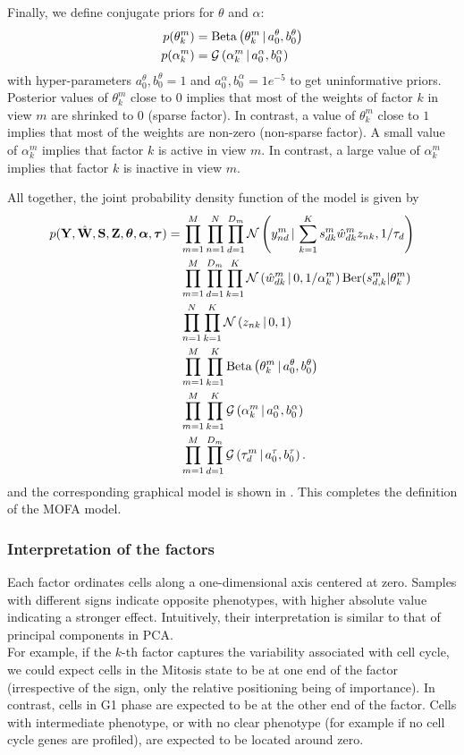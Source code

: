 Finally, we define conjugate priors for $\theta$ and $\alpha$:
\begin{align}
	p(\theta_k^m) &= \text{Beta}\left(\theta_k^m \,|\, a_0^\theta,b_0^\theta\right)\\
	p(\alpha_k^m) &= \mathcal{G}\left(\alpha_k^m \,|\, a_0^\alpha, b_0^\alpha\right)
\end{align}
with hyper-parameters $a_0^\theta,b_0^\theta =1$ and $a_0^\alpha, b_0^\alpha=1e^{-5}$ to get uninformative priors. Posterior values of $\theta_k^m$ close to $0$ implies that most of the weights of factor $k$ in view $m$ are shrinked to $0$ (sparse factor). In contrast, a value of $\theta_k^m$ close to $1$ implies that most of the weights are non-zero (non-sparse factor). A small value of $\alpha_k^m$ implies that factor $k$ is active in view $m$. In contrast, a large value of $\alpha_k^m$ implies that factor $k$ is inactive in view $m$.

All together, the joint probability density function of the model is given by
\begin{align}
	\begin{split}
	p({\bf Y},\hat{{\bf W}},{\bf S},{\bf Z},\mbox{\boldmath $\theta$}, \mbox{\boldmath $\alpha$}, \mbox{\boldmath $\tau$})  = &\prod_{m=1}^{M} \prod_{n=1}^{N} \prod_{d=1}^{D_m} \mathcal{N}\left(y_{nd}^m \,|\, \sum_{k=1}^{K} s_{dk}^m \hat{w}_{dk}^m z_{nk},1/\tau_d\right) \\
	& \prod_{m=1}^{M}\prod_{d=1}^{D_m} \prod_{k=1}^{K} \mathcal{N}\left(\hat{w}_{dk}^m \,|\, 0,1/\alpha_k^m\right) \text{Ber}(s_{d,k}^m|\theta_k^m) \\
	& \prod_{n=1}^{N} \prod_{k=1}^{K} \mathcal{N}\left(z_{nk} \,|\, 0,1\right) \\
	& \prod_{m=1}^{M} \prod_{k=1}^{K} \text{Beta}\left(\theta_k^m \,|\, a_0^\theta,b_0^\theta\right) \\
	& \prod_{m=1}^{M} \prod_{k=1}^{K} \mathcal{G}\left(\alpha_k^m \,|\, a_0^\alpha, b_0^\alpha\right) \\
	& \prod_{m=1}^{M} \prod_{d=1}^{D_m} \mathcal{G}\left(\tau_d^m \,|\, a_0^\tau,b_0^\tau\right).
	\label{likelihood}
	\end{split}
\end{align}
and the corresponding graphical model is shown in . This completes the definition of the MOFA model.

\subsubsection{Interpretation of the factors}
Each factor ordinates cells along a one-dimensional axis centered at zero. Samples with different signs indicate opposite phenotypes, with higher absolute value indicating a stronger effect. Intuitively, their interpretation is similar to that of principal components in PCA.\\
For example, if the $k$-th factor captures the variability associated with cell cycle, we could expect cells in the Mitosis state to be at one end of the factor (irrespective of the sign, only the relative positioning being of importance). In contrast, cells in G1 phase are expected to be at the other end of the factor. Cells with intermediate phenotype, or with no clear phenotype (for example if no cell cycle genes are profiled), are expected to be located around zero.

